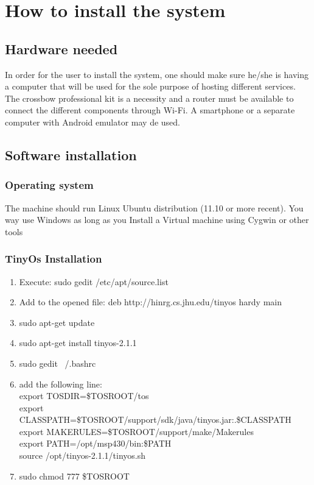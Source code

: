 \documentclass[oneside,12pt,a4paper,final]{book}
\begin{document}
\backmatter


\renewcommand{\bibname}{References}
 


\appendix
\chapter{How to install the system}
\section{Hardware needed}
In order for the user to install the system, one should make sure he/she is having a computer that will be used for the sole purpose of hosting different services. The crossbow professional kit is a necessity and a router must be available to connect the different components through Wi-Fi. A smartphone or a separate computer with Android emulator may de used.

\section{Software installation}

\subsection{Operating system}
The machine should run Linux Ubuntu distribution (11.10 or more recent). You way use Windows as long as you Install a Virtual machine using Cygwin or other tools
\subsection{TinyOs Installation}
\begin{enumerate}
\item Execute: sudo gedit /etc/apt/source.list
\item Add to the opened file: deb http://hinrg.cs.jhu.edu/tinyos hardy main
\item sudo apt-get update 
\item sudo apt-get install tinyos-2.1.1
\item sudo gedit ~/.bashrc
\item add the following line: \\
export TOSDIR=\$TOSROOT/tos \\
export CLASSPATH=\$TOSROOT/support/sdk/java/tinyos.jar:.\$CLASSPATH \\
export MAKERULES=\$TOSROOT/support/make/Makerules \\
export PATH=/opt/msp430/bin:\$PATH \\
source /opt/tinyos-2.1.1/tinyos.sh \\

\item sudo chmod 777 \$TOSROOT
\end{enumerate}
\end{document}
